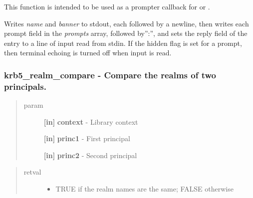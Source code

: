 \documentclass[letterpaper,10pt,english]{sphinxmanual}
\begin{document}
This function is intended to be used as a prompter callback for {\hyperref[appdev/refs/api/krb5_get_init_creds_password:c.krb5_get_init_creds_password]{}} or {\hyperref[appdev/refs/api/krb5_init_creds_init:c.krb5_init_creds_init]{}} .

Writes \emph{name} and \emph{banner} to stdout, each followed by a newline, then writes each prompt field in the \emph{prompts} array, followed by'':'', and sets the reply field of the entry to a line of input read from stdin. If the hidden flag is set for a prompt, then terminal echoing is turned off when input is read.


\subsubsection{krb5\_realm\_compare -  Compare the realms of two principals.}
\label{appdev/refs/api/krb5_realm_compare::doc}\label{appdev/refs/api/krb5_realm_compare:krb5-realm-compare-compare-the-realms-of-two-principals}

\begin{fulllineitems}
\label{appdev/refs/api/krb5_realm_compare:c.krb5_realm_compare}
\end{fulllineitems}

\begin{quote}\begin{description}
\item[{param}] \leavevmode
\textbf{{[}in{]}} \textbf{context} - Library context

\textbf{{[}in{]}} \textbf{princ1} - First principal

\textbf{{[}in{]}} \textbf{princ2} - Second principal

\end{description}\end{quote}
\begin{quote}\begin{description}
\item[{retval}] \leavevmode\begin{itemize}
\item {} 
TRUE   if the realm names are the same; FALSE otherwise

\end{itemize}

\end{description}\end{quote}
\end{document}
